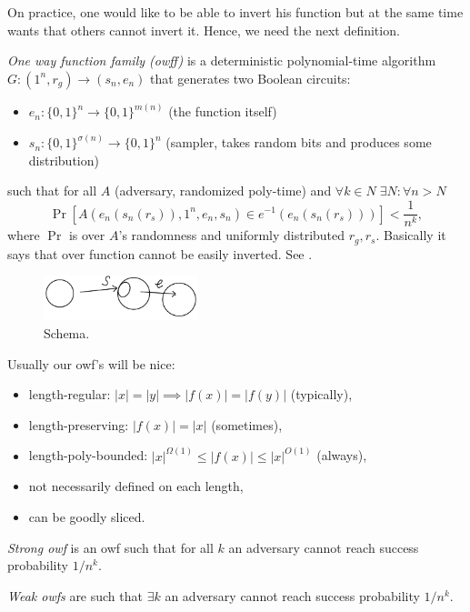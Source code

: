 On practice, one would like to be able to invert his function but at the same time wants that others cannot invert it.
Hence, we need the next definition.
\begin{definition}
    \emph{One way function family (owff)} is a deterministic polynomial-time algorithm $G \colon (1^n, r_g) \to (s_n, e_n)$ that generates two Boolean circuits:
    \begin{itemize}
        \item $e_n \colon \{0, 1\}^n \to \{0, 1\}^{m(n)}$ (the function itself)
        \item $s_n \colon \{0, 1\}^{\sigma(n)} \to \{0, 1\}^n$ (sampler, takes random bits and produces some distribution)
    \end{itemize}
    such that for all $A$ (adversary, randomized poly-time) and $\forall k \in N \; \exists N \colon \forall n > N$
    \[
        \Pr[A(e_n(s_n(r_s)), 1^n, e_n, s_n) \in e^{-1}(e_n(s_n(r_s)))] < \frac 1 {n^k},
    \] where $\Pr$ is over $A$'s randomness and uniformly distributed $r_g, r_s$.
    Basically it says that over function cannot be easily inverted.
    See .
 \begin{figure}[H]
        \centering
        \includegraphics[width=0.4\textwidth]{figures/2FC91310-FBF1-4D04-ABDB-24F1FDF8893A}
        \caption{Schema.}
        \label{fig:2fc91310-fbf1-4d04-abdb-24f1fdf8893a}
    \end{figure}
\end{definition}

Usually our owf's will be nice:
\begin{itemize}
    \item length-regular: $|x| = |y| \implies |f(x)| = |f(y)|$ (typically),
    \item length-preserving: $|f(x)| = |x|$ (sometimes),
    \item length-poly-bounded: $|x|^{\Omega(1)} \leq |f(x)| \leq |x|^{O(1)}$ (always),
    \item not necessarily defined on each length,
    \item can be goodly sliced.
\end{itemize}

\begin{definition}
    \emph{Strong owf} is an owf such that for all $k$ an adversary cannot reach success probability $1/n^k$.

    \emph{Weak owfs} are such that $\exists k$ an adversary cannot reach success probability $1/n^k$.
\end{definition}

